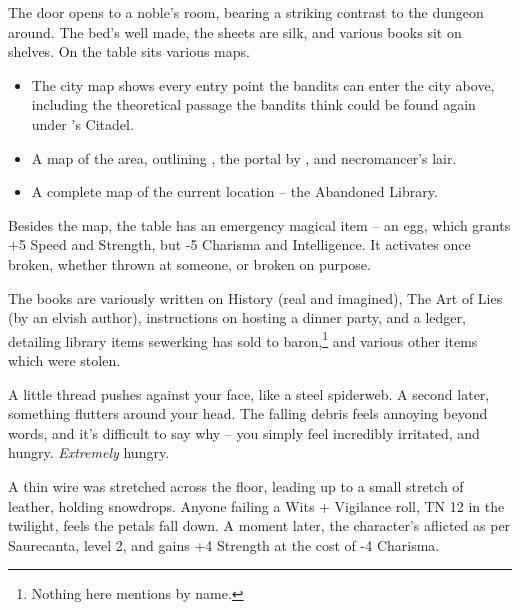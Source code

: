 
\begin{boxtext}
	The door opens to a noble's room, bearing a striking contrast to the dungeon around.  The bed's well made, the sheets are silk, and various books sit on shelves.  On the table sits various maps.
\end{boxtext}

\begin{itemize}

	\item{The city map shows every entry point the bandits can enter the city above, including the theoretical passage the bandits think could be found again under 's Citadel.}

	\item{A map of the area, outlining , the portal by , and \gls{necromancer}'s lair.}

	\item{A complete map of the current location -- the Abandoned Library.}

\end{itemize}

Besides the map, the table has an emergency magical item -- an egg, which grants +5 Speed and Strength, but -5 Charisma and Intelligence.  It activates once broken, whether thrown at someone, or broken on purpose.

The books are variously written on History (real and imagined), The Art of Lies (by an elvish author), instructions on hosting a dinner party, and a ledger, detailing library items \gls{sewerking} has sold to \gls{baron},\footnote{Nothing here mentions  by name.} and various other items which were stolen.


\begin{boxtext}
	A little thread pushes against your face, like a steel spiderweb.  A second later, something flutters around your head.  The falling debris feels annoying beyond words, and it's difficult to say why -- you simply feel incredibly irritated, and hungry.  \emph{Extremely} hungry.
\end{boxtext}

A thin wire was stretched across the floor, leading up to a small stretch of leather, holding snowdrops.  Anyone failing a Wits + Vigilance roll, TN 12 in the twilight, feels the petals fall down.  A moment later, the character's aflicted as per Saurecanta, level 2, and gains +4 Strength at the cost of -4 Charisma.

